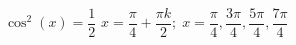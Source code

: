 { $\cos^{2} \left( x \right) = \dfrac{1}{2}$}
{ $x = \dfrac{\pi}{4} + \dfrac{\pi k}{2}; \; x = \dfrac{\pi}{4}, \dfrac{3\pi}{4}, \dfrac{5\pi}{4}, \dfrac{7\pi}{4}$}
